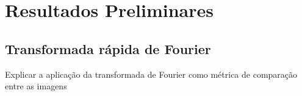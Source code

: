 \section{Resultados Preliminares}

\subsection{Transformada rápida de Fourier}
Explicar a aplicação da transformada de Fourier como métrica de comparação entre as imagens

% 
% 
% 
% 
